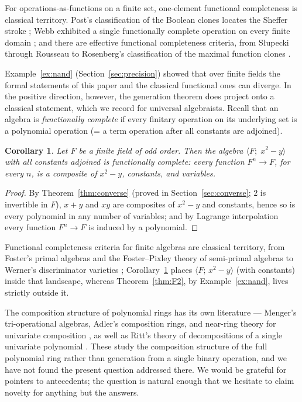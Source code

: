 \documentclass[11pt]{article}
\newtheorem{corollary}[theorem]{Corollary}
\theoremstyle{definition}
\theoremstyle{remark}
\begin{document}
For operations-as-functions on a finite set, one-element functional
completeness
is classical territory.  Post's classification of the Boolean clones
locates the Sheffer stroke \cite{Sheffer,Post}; Webb exhibited a
single functionally complete operation on every finite domain
\cite{Webb}; and
there are effective functional completeness criteria, from S{\l}upecki through
Rousseau to Rosenberg's classification of the maximal function clones
\cite{Slupecki,Rousseau,Rosenberg}.

Example~\ref{ex:nand} (Section~\ref{sec:precision}) showed that over
finite fields the formal statements of this paper and the classical
functional ones can diverge.  In the positive direction, however,
the generation theorem does project onto a classical statement,
which we record for universal algebraists.
Recall that an algebra is \emph{functionally complete} if every
finitary operation on its underlying set is a polynomial operation
(= a term operation after all constants are adjoined).

\begin{corollary}\label{cor:funcomplete}
Let $F$ be a finite field of odd order.  Then the algebra
$\langle F;\; x^2 - y \rangle$ with all constants adjoined is
functionally complete: every function $F^n \to F$, for every $n$, is
a composite of $x^2 - y$, constants, and variables.
\end{corollary}

\begin{proof}
By Theorem~\ref{thm:converse} (proved in Section~\ref{sec:converse};
$2$ is invertible in $F$), $x + y$ and $xy$ are composites of
$x^2 - y$ and constants, hence so is every polynomial in any number
of variables; and by Lagrange interpolation every function
$F^n \to F$ is induced by a polynomial.
\end{proof}

\noindent
Functional completeness criteria for finite algebras are classical
territory, from Foster's primal algebras and the Foster--Pixley
theory of semi-primal algebras \cite{Foster,FosterPixley} to Werner's
discriminator varieties \cite{Werner}; Corollary~\ref{cor:funcomplete}
places $\langle F;\, x^2 - y\rangle$ (with constants) inside that
landscape, whereas Theorem~\ref{thm:F2}, by Example~\ref{ex:nand},
lives strictly outside it.

\medskip

The composition structure of polynomial rings has its own literature
--- Menger's tri-operational algebras, Adler's composition rings, and
near-ring theory for univariate composition \cite{Menger,Adler,Pilz},
as well as Ritt's theory of decompositions of a single univariate
polynomial \cite{Ritt}.  These study the composition structure of the
full polynomial ring rather than generation from a single binary
operation, and we have not found the present question addressed
there.  We would be grateful for pointers to antecedents; the
question is natural enough that we hesitate to claim novelty for
anything but the answers.
\end{document}
